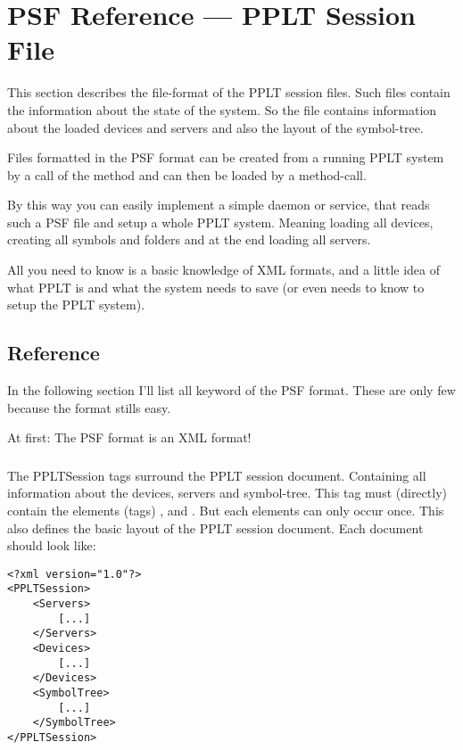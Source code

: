 \newcommand{\PSFTag}[1]{\index{PSF Elements!#1}}



\chapter{PSF Reference --- \textbf{P}PLT \textbf{S}ession \textbf{F}ile}

This section describes the file-format of the PPLT session files. Such 
files contain the information about the state of the system. 
So the file contains information about the loaded devices and servers and
also the layout of the symbol-tree.

Files formatted in the PSF format can be created from a running PPLT system by 
a call of the method  and can then be loaded by a 
 method-call.

By this way you can easily implement a simple daemon or service, that reads 
such a PSF file and setup a whole PPLT system. Meaning loading all devices, 
creating all symbols and folders and at the end loading all servers.

All you need to know is a basic knowledge of XML formats, and a little idea of 
what PPLT is and what the system needs to save (or even needs to know to setup
the PPLT system). 

\section{Reference}
In the following section I'll list all keyword of the PSF format. These are only few
because the format stills easy. 

At first: The PSF format is an XML format!

\subsection{}
\PSFTag{PPLTSession}
The PPLTSession tags surround the PPLT session document. Containing all 
information about the devices, servers and symbol-tree. This tag must
(directly) contain the elements (tags) , 
and . But each elements can only occur once.
This also defines the basic layout of the PPLT session document. Each document
should look like:
\begin{verbatim}
<?xml version="1.0"?>
<PPLTSession>
    <Servers>
        [...]
    </Servers>
    <Devices>
        [...]
    </Devices>
    <SymbolTree>
        [...]
    </SymbolTree>
</PPLTSession>
\end{verbatim}


